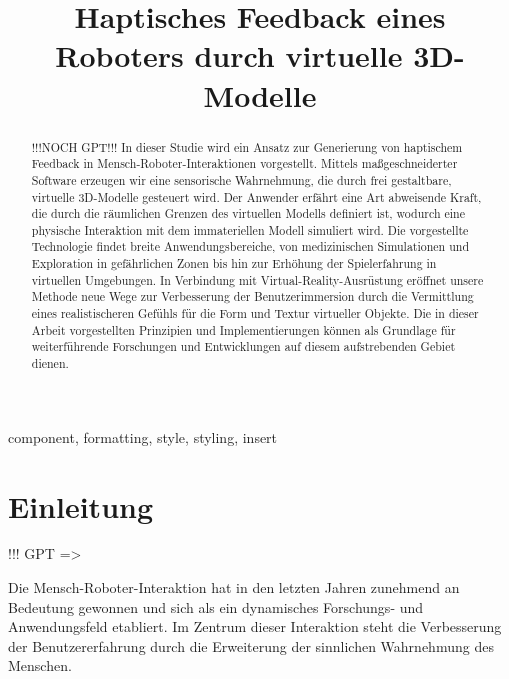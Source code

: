 \documentclass[conference]{IEEEtran}
\begin{document}
\title{Haptisches Feedback eines Roboters durch virtuelle 3D-Modelle}

\author{
    \and
}
\maketitle

\begin{abstract}
!!!NOCH GPT!!!
In dieser Studie wird ein Ansatz zur Generierung von haptischem Feedback in Mensch-Roboter-Interaktionen vorgestellt. Mittels maßgeschneiderter Software erzeugen wir eine sensorische Wahrnehmung, die durch frei gestaltbare, virtuelle 3D-Modelle gesteuert wird. Der Anwender erfährt eine Art abweisende Kraft, die durch die räumlichen Grenzen des virtuellen Modells definiert ist, wodurch eine physische Interaktion mit dem immateriellen Modell simuliert wird. Die vorgestellte Technologie findet breite Anwendungsbereiche, von medizinischen Simulationen und Exploration in gefährlichen Zonen bis hin zur Erhöhung der Spielerfahrung in virtuellen Umgebungen. In Verbindung mit Virtual-Reality-Ausrüstung eröffnet unsere Methode neue Wege zur Verbesserung der Benutzerimmersion durch die Vermittlung eines realistischeren Gefühls für die Form und Textur virtueller Objekte. Die in dieser Arbeit vorgestellten Prinzipien und Implementierungen können als Grundlage für weiterführende Forschungen und Entwicklungen auf diesem aufstrebenden Gebiet dienen.
\end{abstract}

\begin{IEEEkeywords}
    component, formatting, style, styling, insert
\end{IEEEkeywords}

\section{Einleitung}
!!! GPT =>

Die Mensch-Roboter-Interaktion hat in den letzten Jahren zunehmend an Bedeutung gewonnen und sich als ein dynamisches Forschungs- und Anwendungsfeld etabliert. Im Zentrum dieser Interaktion steht die Verbesserung der Benutzererfahrung durch die Erweiterung der sinnlichen Wahrnehmung des Menschen.
\end{document}

